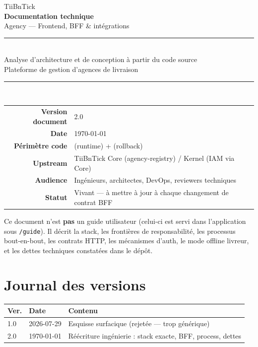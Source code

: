 \documentclass[11pt,a4paper,openany]{report}
\newcommand{\pathref}[1]{\texttt{\detokenize{#1}}}
\newcommand{\api}[1]{\texttt{#1}}
\begin{document}
\begin{titlepage}
  \centering
  \vspace*{1.8cm}
  {\sffamily\Large TiiBnTick}\\[0.35cm]
  {\sffamily\huge\bfseries Documentation technique}\\[0.35cm]
  {\sffamily\LARGE Agency --- Frontend, BFF \& intégrations}\\[1.2cm]
  \rule{\textwidth}{1.5pt}\\[0.5cm]
  {\large Analyse d'architecture et de conception à partir du code source}\\[0.25cm]
  {\large Plateforme de gestion d'agences de livraison}\\[0.5cm]
  \rule{\textwidth}{1.5pt}\\[1.4cm]
  \begin{tabular}{@{}rl@{}}
    \textbf{Version document} & 2.0 \\
    \textbf{Date} & \today \\
    \textbf{Périmètre code} & \pathref{frontend/} (runtime) + \pathref{backend/tnt-agency/} (rollback) \\
    \textbf{Upstream} & TiiBnTick Core (agency-registry) / Kernel (IAM via Core) \\
    \textbf{Audience} & Ingénieurs, architectes, DevOps, reviewers techniques \\
    \textbf{Statut} & Vivant --- à mettre à jour à chaque changement de contrat BFF \\
  \end{tabular}
  \vfill
  \begin{minipage}{0.92\textwidth}
    \small
    Ce document n'est \textbf{pas} un guide utilisateur (celui-ci est servi dans
    l'application sous \api{/guide}). Il décrit la stack, les frontières de
    responsabilité, les processus bout-en-bout, les contrats HTTP, les
    mécanismes d'auth, le mode offline livreur, et les dettes techniques
    constatées dans le dépôt.
  \end{minipage}
\end{titlepage}

\clearpage
\chapter*{Journal des versions}
\begin{tabular}{@{}llp{}@{}}
\toprule
\textbf{Ver.} & \textbf{Date} & \textbf{Contenu} \\
\midrule
1.0 & 2026-07-29 & Esquisse surfacique (rejetée --- trop générique) \\
2.0 & \today & Réécriture ingénierie : stack exacte, BFF, process, dettes \\
\bottomrule
\end{tabular}

\tableofcontents
\clearpage













\end{document}
